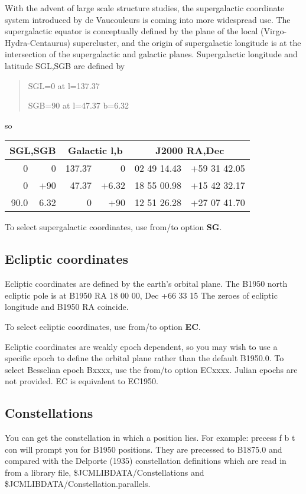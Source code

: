 With the advent of large scale structure studies, the supergalactic
coordinate system introduced by de Vaucouleurs is coming into more
widespread use. The supergalactic equator is conceptually defined
by the plane of the local (Virgo-Hydra-Centaurus) supercluster, and the
origin of supergalactic longitude is at the intersection of the 
supergalactic and galactic planes.
Supergalactic longitude and latitude SGL,SGB are
defined by
\begin{quote}
SGL=0 at l=137.37

SGB=90 at l=47.37 b=6.32
\end{quote}
so
\begin{center}
\begin{tabular}{rrrrrr}
\multicolumn{2}{c}{  SGL,SGB}
&\multicolumn{2}{c}{Galactic l,b}
&\multicolumn{2}{c}{ J2000 RA,Dec }\\
 \hline
0&0& 137.37& 0 & 02 49 14.43&+59 31 42.05\\
0&+90& 47.37& +6.32& 18 55 00.98 & +15 42 32.17\\
90.0&6.32 & 0& +90&12 51 26.28&+27 07 41.70\\
\end{tabular}
\end{center}

To select supergalactic coordinates, use from/to option {\bf SG}.


\subsection{Ecliptic coordinates}

Ecliptic coordinates are defined by the earth's orbital plane.
The B1950 north ecliptic pole is at B1950 RA 18 00 00, Dec +66 33 15
The zeroes of ecliptic longitude and B1950 RA coincide.

To select ecliptic coordinates, use from/to option {\bf EC}.

Ecliptic coordinates are weakly epoch dependent, so you may wish
to use a specific epoch to define the orbital plane rather than 
the default B1950.0. To select Besselian epoch Bxxxx, use
the from/to option ECxxxx. Julian epochs are not provided.
EC is equivalent to EC1950.

\subsection{Constellations}

You can get the constellation in which a position lies.
For example: 
precess f b t con
will prompt you for B1950 positions. They are precessed
to B1875.0 and compared with the Delporte (1935) constellation
definitions which are read in from a library file, \$JCMLIBDATA/Constellations
and \$JCMLIBDATA/Constellation.parallels.

